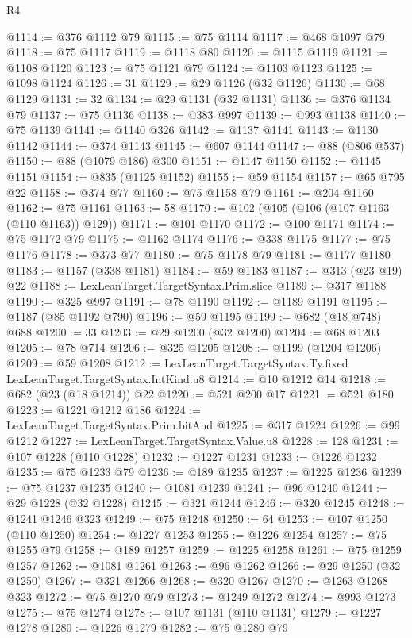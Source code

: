 \begin{lexlean}{R4}
\begin{coremodule}
@1114 := @376 @1112 @79
@1115 := @75 @1114
@1117 := @468 @1097 @79
@1118 := @75 @1117
@1119 := @1118 @80
@1120 := @1115 @1119
@1121 := @1108 @1120
@1123 := @75 @1121 @79
@1124 := @1103 @1123
@1125 := @1098 @1124
@1126 := 31
@1129 := @29 @1126 (@32 @1126)
@1130 := @68 @1129
@1131 := 32
@1134 := @29 @1131 (@32 @1131)
@1136 := @376 @1134 @79
@1137 := @75 @1136
@1138 := @383 @997
@1139 := @993 @1138
@1140 := @75 @1139
@1141 := @1140 @326
@1142 := @1137 @1141
@1143 := @1130 @1142
@1144 := @374 @1143
@1145 := @607 @1144
@1147 := @88 (@806 @537)
@1150 := @88 (@1079 @186) @300
@1151 := @1147 @1150
@1152 := @1145 @1151
@1154 := @835 (@1125 @1152)
@1155 := @59 @1154
@1157 := @65 @795 @22
@1158 := @374 @77
@1160 := @75 @1158 @79
@1161 := @204 @1160
@1162 := @75 @1161
@1163 := 58
@1170 := @102 (@105 (@106 (@107 @1163 (@110 @1163)) @129))
@1171 := @101 @1170
@1172 := @100 @1171
@1174 := @75 @1172 @79
@1175 := @1162 @1174
@1176 := @338 @1175
@1177 := @75 @1176
@1178 := @373 @77
@1180 := @75 @1178 @79
@1181 := @1177 @1180
@1183 := @1157 (@338 @1181)
@1184 := @59 @1183
@1187 := @313 (@23 @19) @22
@1188 := LexLeanTarget.TargetSyntax.Prim.slice
@1189 := @317 @1188
@1190 := @325 @997
@1191 := @78 @1190
@1192 := @1189 @1191
@1195 := @1187 (@85 @1192 @790)
@1196 := @59 @1195
@1199 := @682 (@18 @748) @688
@1200 := 33
@1203 := @29 @1200 (@32 @1200)
@1204 := @68 @1203
@1205 := @78 @714
@1206 := @325 @1205
@1208 := @1199 (@1204 @1206)
@1209 := @59 @1208
@1212 := LexLeanTarget.TargetSyntax.Ty.fixed LexLeanTarget.TargetSyntax.IntKind.u8
@1214 := @10 @1212 @14
@1218 := @682 (@23 (@18 @1214)) @22
@1220 := @521 @200 @17
@1221 := @521 @180
@1223 := @1221 @1212 @186
@1224 := LexLeanTarget.TargetSyntax.Prim.bitAnd
@1225 := @317 @1224
@1226 := @99 @1212
@1227 := LexLeanTarget.TargetSyntax.Value.u8
@1228 := 128
@1231 := @107 @1228 (@110 @1228)
@1232 := @1227 @1231
@1233 := @1226 @1232
@1235 := @75 @1233 @79
@1236 := @189 @1235
@1237 := @1225 @1236
@1239 := @75 @1237 @1235
@1240 := @1081 @1239
@1241 := @96 @1240
@1244 := @29 @1228 (@32 @1228)
@1245 := @321 @1244
@1246 := @320 @1245
@1248 := @1241 @1246 @323
@1249 := @75 @1248
@1250 := 64
@1253 := @107 @1250 (@110 @1250)
@1254 := @1227 @1253
@1255 := @1226 @1254
@1257 := @75 @1255 @79
@1258 := @189 @1257
@1259 := @1225 @1258
@1261 := @75 @1259 @1257
@1262 := @1081 @1261
@1263 := @96 @1262
@1266 := @29 @1250 (@32 @1250)
@1267 := @321 @1266
@1268 := @320 @1267
@1270 := @1263 @1268 @323
@1272 := @75 @1270 @79
@1273 := @1249 @1272
@1274 := @993 @1273
@1275 := @75 @1274
@1278 := @107 @1131 (@110 @1131)
@1279 := @1227 @1278
@1280 := @1226 @1279
@1282 := @75 @1280 @79

\end{coremodule}
\end{lexlean}
